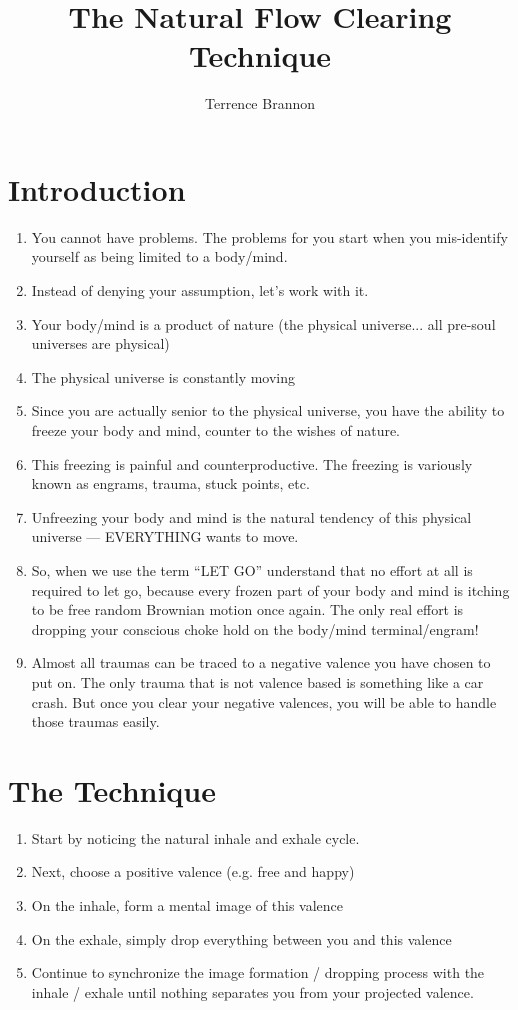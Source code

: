 \documentclass[12pt]{article}
\begin{document}
\title{The Natural Flow Clearing Technique}
\author{Terrence Brannon}
\maketitle

\section{Introduction}

\begin{enumerate}
\item You cannot have problems. The problems for you start when you
  mis-identify yourself as being limited to a body/mind.
\item Instead of denying your assumption, let's work with it. 
\item Your body/mind is a product of nature (the physical
  universe... all pre-soul universes are physical)
\item The physical universe is constantly moving
\item Since you are actually senior to the physical universe, you have
  the ability to freeze your body and mind, counter to the wishes of
  nature. 
\item This freezing is painful and counterproductive. The freezing is
  variously known as engrams, trauma, stuck points, etc.
\item Unfreezing your body and mind is the natural tendency of this
  physical universe --- EVERYTHING wants to move.
\item So, when we use the term ``LET GO'' understand that no effort at
  all is required to let go, because every frozen part of your body
  and mind is itching to be free random Brownian motion once
  again. The only real effort is dropping your conscious choke hold on
  the body/mind terminal/engram!
\item Almost all traumas can be traced to a negative valence you have
  chosen to put on. The only trauma that is not valence based is
  something like a car crash. But once you clear your negative
  valences, you will be able to handle those traumas easily.
\end{enumerate}

\section{The Technique}

\begin{enumerate}
\item Start by noticing the natural inhale and exhale cycle.
\item Next, choose a positive valence (e.g. free and happy)
\item On the inhale, form a mental image of this valence
\item On the exhale, simply drop everything between you and this
  valence
\item Continue to synchronize the image formation / dropping process
  with the inhale / exhale until nothing
  separates you from your projected valence.

\end{enumerate}
\end{document}
